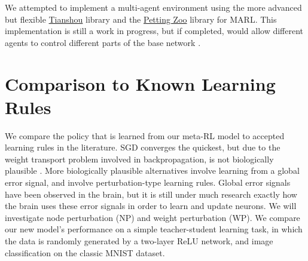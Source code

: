 \documentclass{article}
\begin{document}
We attempted to implement a multi-agent environment using the more advanced but flexible \href{https://github.com/thu-ml/tianshou}{Tianshou} library and the \href{https://pettingzoo.farama.org/}{Petting Zoo} library for MARL. This implementation is still a work in progress, but if completed, would allow different agents to control different parts of the base network \cite{tianshou, pettingzoo}.

\section{Comparison to Known Learning Rules}

We compare the policy that is learned from our meta-RL model to accepted learning rules in the literature. SGD converges the quickest, but due to the weight transport problem involved in backpropagation, is not biologically plausible \cite{mazzoni1991}. More biologically plausible alternatives involve learning from a global error signal, and involve perturbation-type learning rules. Global error signals have been observed in the brain, but it is still under much research exactly how the brain uses these error signals in order to learn and update neurons. We will investigate node perturbation (NP) and weight perturbation (WP). We compare our new model's performance on a simple teacher-student learning task, in which the data is randomly generated by a two-layer ReLU network, and image classification on the classic MNIST dataset.
\end{document}
